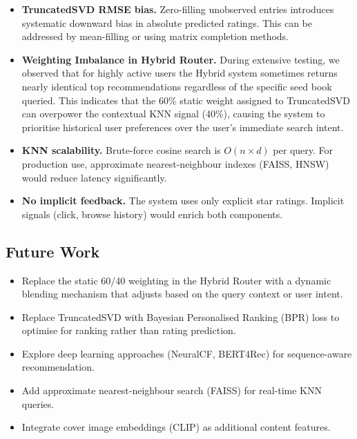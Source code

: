 \documentclass[12pt, a4paper]{article}
\begin{document}
\begin{itemize}[leftmargin=2cm]
  \item \textbf{TruncatedSVD RMSE bias.} Zero-filling unobserved entries
        introduces systematic downward bias in absolute predicted ratings.
        This can be addressed by mean-filling or using matrix completion methods.
  \item \textbf{Weighting Imbalance in Hybrid Router.} During extensive testing, we observed that for highly active users the Hybrid system sometimes returns nearly identical top recommendations regardless of the specific seed book queried. This indicates that the 60\% static weight assigned to TruncatedSVD can overpower the contextual KNN signal (40\%), causing the system to prioritise historical user preferences over the user's immediate search intent.
  \item \textbf{KNN scalability.} Brute-force cosine search is $O(n \times d)$
        per query. For production use, approximate nearest-neighbour indexes
        (FAISS, HNSW) would reduce latency significantly.
  \item \textbf{No implicit feedback.} The system uses only explicit star ratings.
        Implicit signals (click, browse history) would enrich both components.
\end{itemize}

\subsection{Future Work}

\begin{itemize}[leftmargin=2cm]
  \item Replace the static 60/40 weighting in the Hybrid Router with a dynamic blending mechanism that adjusts based on the query context or user intent.
  \item Replace TruncatedSVD with Bayesian Personalised Ranking (BPR) loss
        to optimise for ranking rather than rating prediction.
  \item Explore deep learning approaches (NeuralCF, BERT4Rec) for
        sequence-aware recommendation.
  \item Add approximate nearest-neighbour search (FAISS) for real-time KNN queries.
  \item Integrate cover image embeddings (CLIP) as additional content features.
\end{itemize}
\end{document}
